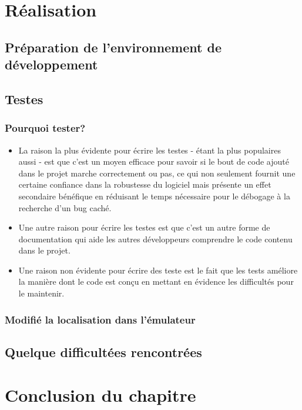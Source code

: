 \section{Réalisation}
\subsection{Préparation de l'environnement de développement}%
\subsection{Testes}
\subsubsection{Pourquoi tester?~\cite{pycon:getting_started_with_automated_testing}}
\begin{itemize}
\item La raison la plus évidente pour écrire les testes - étant la plus populaires aussi - est que c'est un moyen efficace pour savoir si le bout de code ajouté dans le projet marche correctement ou pas, ce qui non seulement fournit une certaine confiance dans la robustesse du logiciel mais présente un effet secondaire bénéfique en réduisant le temps nécessaire pour le débogage à la recherche d'un bug caché. %
\item Une autre raison pour écrire les testes est que c'est un autre forme de documentation qui aide les autres développeurs comprendre le code contenu dans le projet.
\item Une raison non évidente pour écrire des teste est le fait que les tests améliore la manière dont le code est conçu en mettant en évidence les difficultés pour le maintenir.
\end{itemize}
\subsubsection{Modifié la localisation dans l'émulateur}%

\subsection{Quelque difficultées rencontrées}

\section{Conclusion du chapitre}